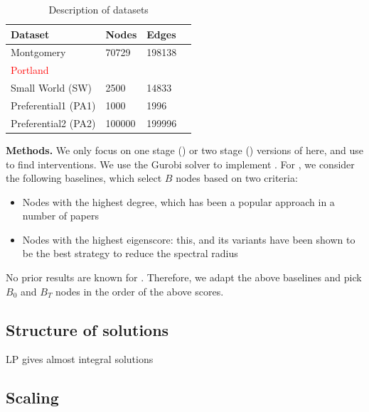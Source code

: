 \begin{table}[!h]
\centering
\begin{tabular}{llll}
\hline
 \textbf{Dataset} & \textbf{Nodes} & \textbf{Edges}   \\ \hline
 Montgomery & 70729 & 198138 \\
\textcolor{red}{Portland} & & \\
 Small World (SW) & 2500 & 14833 \\   
 Preferential1 (PA1) & 1000 & 1996 \\ \hline
Preferential2 (PA2) & 100000 & 199996 \\
\end{tabular}
\caption{Description of datasets}
\label{tab:datasets}
\end{table}

\noindent
\textbf{Methods.}
We only focus on one stage (\probone) or two stage (\probtwo) versions of \prob{} here, and use \algo{} to find 
interventions. We use the Gurobi solver to implement \algo{}.
For \probone{}, we consider the following baselines, which select $B$ nodes based on two criteria:
\begin{itemize}
\item
Nodes with the highest degree, which has been a popular approach in a number of papers
\cite{salathe:plos12, Barabasi509}
\item
Nodes with the highest eigenscore: this, and its variants have been shown to be the best strategy to reduce the spectral radius
\cite{tong:cikm12,zhang2015controlling,YaoSDM2014,AAAI1816714,PreciadoVM13_2,PreciadoVM13,PreciadoVM14}
\end{itemize}

No prior results are known for \probtwo{}. Therefore, we adapt the above baselines and pick $B_0$ and $B_T$
nodes in the order of the above scores.

\subsection{Structure of solutions}

LP gives almost integral solutions

\subsection{Scaling}

